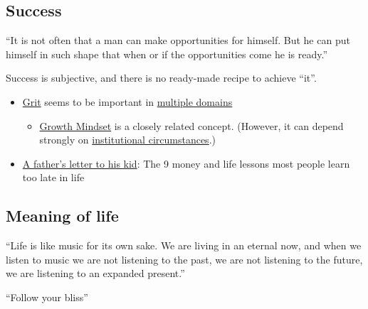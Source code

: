 \documentclass{article}
\begin{document}
\subsection{Success}

\vspace{1cm}
{``It is not often that a man can make opportunities for himself. But he can put himself in such shape that when or if the opportunities come he is ready.''
\\[5pt]
}

Success is subjective, and there is no ready-made recipe to achieve ``it''.

\begin{itemize}
    \item \href{https://www.youtube.com/watch?v=H14bBuluwB8}{Grit} seems to be important in \href{https://psycnet.apa.org/doiLanding?doi=10.1037%2F0022-3514.92.6.1087}{multiple domains}
    \begin{itemize}
        \item \href{https://www.themarginalian.org/2014/01/29/carol-dweck-mindset/}{Growth Mindset} is a closely related concept. (However, it can depend strongly on \href{https://hbr.org/2016/01/what-having-a-growth-mindset-actually-means}{institutional circumstances}.)
    \end{itemize}
    \item \href{https://www.cnbc.com/2020/06/19/fathers-day-letter-to-kid-money-life-lessons-people-learn-too-late-in-life.html}{A father’s letter to his kid}: The 9 money and life lessons most people learn too late in life 
\end{itemize}

\subsection{Meaning of life}

\vspace{1cm}
{``Life is like music for its own sake. We are living in an eternal now, and when we listen to music we are not listening to the past, we are not listening to the future, we are listening to an expanded present.''
\\[5pt]
}

\vspace{1cm}
{``Follow your bliss''
\\[5pt]
}
\end{document}
